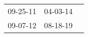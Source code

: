 \begin{supertabular}{p{0.33\columnwidth}p{0.33\columnwidth}p{0.33\columnwidth}}
 09-25-11\textsuperscript{} &  04-03-14\textsuperscript{} \\
 09-07-12\textsuperscript{} &  08-18-19\textsuperscript{} \\
\end{supertabular}
